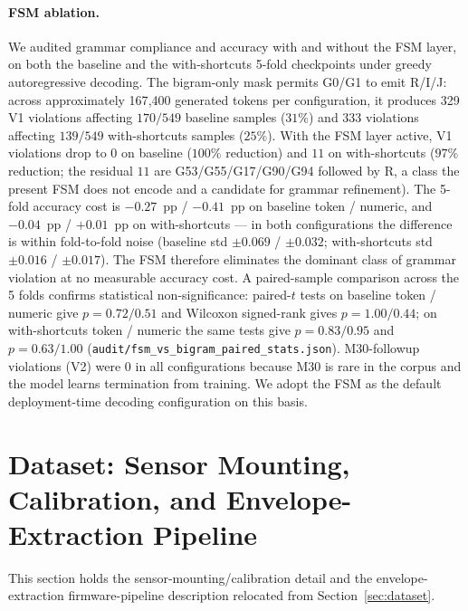 \documentclass[11pt,a4paper]{article}
\begin{document}
\paragraph{FSM ablation.} We audited grammar compliance and accuracy with and without the FSM layer, on both the baseline and the with-shortcuts 5-fold checkpoints under greedy autoregressive decoding. The bigram-only mask permits G0/G1 to emit R/I/J: across approximately 167{,}400 generated tokens per configuration, it produces 329 V1 violations affecting $170 / 549$ baseline samples ($31\%$) and 333 violations affecting $139 / 549$ with-shortcuts samples ($25\%$). With the FSM layer active, V1 violations drop to $0$ on baseline ($100\%$ reduction) and $11$ on with-shortcuts ($97\%$ reduction; the residual $11$ are G53/G55/G17/G90/G94 followed by R, a class the present FSM does not encode and a candidate for grammar refinement). The 5-fold accuracy cost is $-0.27$~pp / $-0.41$~pp on baseline token / numeric, and $-0.04$~pp / $+0.01$~pp on with-shortcuts --- in both configurations the difference is within fold-to-fold noise (baseline std $\pm 0.069$ / $\pm 0.032$; with-shortcuts std $\pm 0.016$ / $\pm 0.017$). The FSM therefore eliminates the dominant class of grammar violation at no measurable accuracy cost. A paired-sample comparison across the 5 folds confirms statistical non-significance: paired-$t$ tests on baseline token / numeric give $p=0.72 / 0.51$ and Wilcoxon signed-rank gives $p=1.00 / 0.44$; on with-shortcuts token / numeric the same tests give $p=0.83 / 0.95$ and $p=0.63 / 1.00$ (\texttt{audit/fsm\_vs\_bigram\_paired\_stats.json}). M30-followup violations (V2) were $0$ in all configurations because M30 is rare in the corpus and the model learns termination from training. We adopt the FSM as the default deployment-time decoding configuration on this basis.

\section{Dataset: Sensor Mounting, Calibration, and Envelope-Extraction Pipeline}
\label{app:dataset-detail}

This section holds the sensor-mounting/calibration detail and the
envelope-extraction firmware-pipeline description relocated from
Section~\ref{sec:dataset}.
\end{document}
